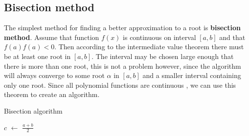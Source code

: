 \documentclass[
  digital, %
  table,   %
  nolof,     %
  nolot,     %
	draft, %
]{fithesis3}
\begin{document}
\subsection{Bisection method}
The simplest method for finding a better approximation to a root is \textbf{bisection method}. Assume that function $f(x)$ is continuous on interval $[a,b]$ and that $f(a)f(a) < 0$. Then according to the intermediate value theorem \parencite{interValue} there must be at least one root in $[a,b]$. The interval may be chosen large enough that there is more than one root, this is not a problem however, since the algorithm will always converge to some root $\alpha$ in $[a,b]$ and a smaller interval containing only one root. Since all polynomial functions are continuous \parencite{polyCont}, we can use this theorem to create an algorithm.

\newcommand*\Let[2]{\State #1 $\gets$ #2}
\algrenewcommand{}
\algrenewcommand{}
\begin{algorithm}
  \caption{Bisection algorithm
    \label{alg:bisect}}
  \begin{algorithmic}[1]
    \Statex
      \Let{$c$}{$\frac{a + b}{2}$}
			\EndIf
				\State {}
				\Else \State {}
			\EndIf
    \EndFunction
  \end{algorithmic}
\end{algorithm}
\end{document}
